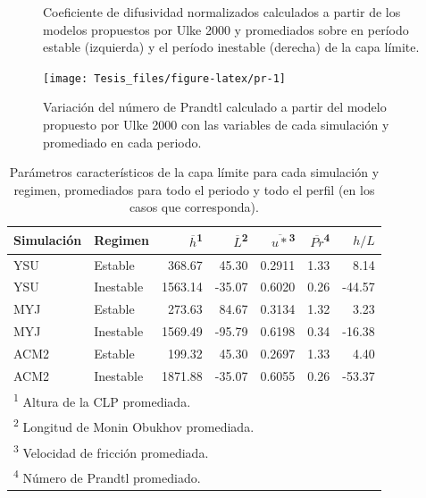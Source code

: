 \documentclass[12pt,spanish,oneside]{book}
\begin{document}
\begin{figure}

{\centering {}\newline{}

}

\caption{Coeficiente de difusividad normalizados calculados a partir de los modelos propuestos por Ulke 2000 y promediados sobre en período estable (izquierda) y el período inestable (derecha) de la capa límite. \label{kh-ulke}}\label{fig:k_norm}
\end{figure}

\begin{figure}

{\centering \texttt{[image: Tesis\_files/figure-latex/pr-1]} 

}

\caption{Variación del número de Prandtl calculado a partir del modelo propuesto por Ulke 2000 con las variables de cada simulación y promediado en cada periodo. \label{Pr}}\label{fig:pr}
\end{figure}

\begin{table}

\caption{\label{tab:tabla-clp}Parámetros característicos de la capa límite para cada simulación y regimen, promediados para todo el periodo y todo el perfil (en los casos que corresponda).}
\centering
\begin{tabular}[t]{llrrrrr}
\toprule
Simulación & Regimen & $\overline{h}$\textsuperscript{1} & $\overline{L}$\textsuperscript{2} & $\overline{u*}$\textsuperscript{3} & $\overline{Pr}$\textsuperscript{4} & $h/L$\\
\midrule
YSU & Estable & 368.67 & 45.30 & 0.2911 & 1.33 & 8.14\\
YSU & Inestable & 1563.14 & -35.07 & 0.6020 & 0.26 & -44.57\\
MYJ & Estable & 273.63 & 84.67 & 0.3134 & 1.32 & 3.23\\
MYJ & Inestable & 1569.49 & -95.79 & 0.6198 & 0.34 & -16.38\\
ACM2 & Estable & 199.32 & 45.30 & 0.2697 & 1.33 & 4.40\\
ACM2 & Inestable & 1871.88 & -35.07 & 0.6055 & 0.26 & -53.37\\
\bottomrule
\multicolumn{7}{l}{\textsuperscript{1} Altura de la CLP promediada.}\\
\multicolumn{7}{l}{\textsuperscript{2} Longitud de Monin Obukhov promediada.}\\
\multicolumn{7}{l}{\textsuperscript{3} Velocidad de fricción promediada.}\\
\multicolumn{7}{l}{\textsuperscript{4} Número de Prandtl promediado.}\\
\end{tabular}
\end{table}
\end{document}
